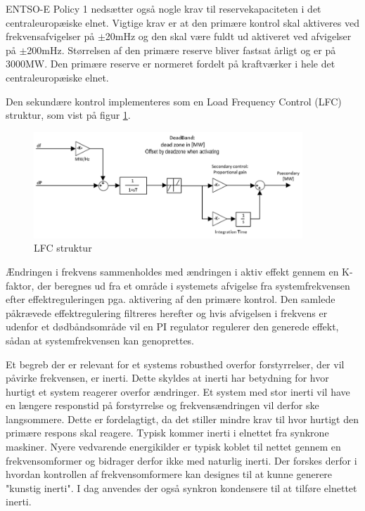 ENTSO-E Policy 1 nedsætter også nogle krav til reservekapaciteten i det centraleuropæiske elnet. Vigtige krav er at den primære kontrol skal aktiveres ved frekvensafvigelser på $\pm$20mHz og den skal være fuldt ud aktiveret ved afvigelser på $\pm$200mHz. Størrelsen af den primære reserve bliver fastsat årligt og er på 3000MW. Den primære reserve er normeret fordelt på kraftværker i hele det centraleuropæiske elnet.

Den sekundære kontrol implementeres som en Load Frequency Control (LFC) struktur, som vist på figur \ref{fig:sekundaerkontrol}.

\begin{figure}[H]
	\centering
	\includegraphics[width=0.9\textwidth]{figurer/Sekundaer_kontrol}
	\caption{LFC struktur}
	\label{fig:sekundaerkontrol}
\end{figure}

Ændringen i frekvens sammenholdes med ændringen i aktiv effekt gennem en K-faktor, der beregnes ud fra et område i systemets afvigelse fra systemfrekvensen efter effektreguleringen pga. aktivering af den primære kontrol. Den samlede påkrævede effektregulering filtreres herefter og hvis afvigelsen i frekvens er udenfor et dødbåndsområde vil en PI regulator regulerer den generede effekt, sådan at systemfrekvensen kan genoprettes.

Et begreb der er relevant for et systems robusthed overfor forstyrrelser, der vil påvirke frekvensen, er inerti. Dette skyldes at inerti har betydning for hvor hurtigt et system reagerer overfor ændringer. Et system med stor inerti vil have en længere responstid på forstyrrelse og frekvensændringen vil derfor ske langsommere. Dette er fordelagtigt, da det stiller mindre krav til hvor hurtigt den primære respons skal reagere. Typisk kommer inerti i elnettet fra synkrone maskiner. Nyere vedvarende energikilder er typisk koblet til nettet gennem en frekvensomformer og bidrager derfor ikke med naturlig inerti. Der forskes derfor i hvordan kontrollen af frekvensomformere kan designes til at kunne generere "kunstig inerti". I dag anvendes der også synkron kondensere til at tilføre elnettet inerti.


